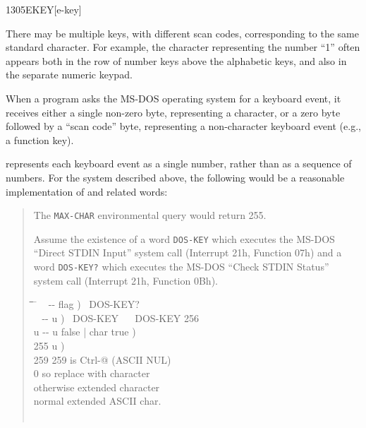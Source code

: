 \begin{worddef}{1305}{EKEY}[e-key]
\begin{defer}
		There may be multiple keys, with different scan codes,
		corresponding to the same standard character. For example,
		the character representing the number ``1'' often appears both
		in the row of number keys above the alphabetic keys, and also
		in the separate numeric keypad.

		When a program asks the MS-DOS operating system for a keyboard
		event, it receives either a single non-zero byte, representing
		a character, or a zero byte followed by a ``scan code'' byte,
		representing a non-character keyboard event (e.g., a function
		key).

		 represents each keyboard event as a single number,
		rather than as a sequence of numbers. For the system described
		above, the following would be a reasonable implementation of
		 and related words:

		\begin{quote}
			The \texttt{MAX-CHAR} environmental query would return 255.

			Assume the existence of a word
			\texttt{DOS-KEY} 
			which executes the MS-DOS ``Direct STDIN Input'' system call
			(Interrupt 21h, Function 07h) and a word
			\texttt{DOS-KEY?} 
			which executes the MS-DOS ``Check STDIN Status'' system call
			(Interrupt 21h, Function 0Bh).

			\ttfamily
			\begin{tabbing}
			\tab \= \tab \= \tab \= \tab \= \hspace{7em} \= \kill
			\word{:} ~  -{}- flag )~
				DOS-KEY?~  \word{;} \\[\parskip]

			\word{:} ~  -{}- u )~
				DOS-KEY~   ~
					DOS-KEY 256 \word{+}~  \word{;} \\[\parskip]

			\+ \word{:}   u -{}- u false | char true ) \\
				\+  255   		\>\>\>\>	\word{p} u ) \\
					 259 \word{=}  		\>\>\>		 259 is Ctrl-@ (ASCII NUL) \\
					\>  0  \>\>		 so replace with character \\
				\-   		\>\>\>		 otherwise extended character \\
			\-  						\>\>\>\>	 normal extended ASCII char. \\
			\word{;} \\[\parskip]


\end{tabbing}
\end{quote}
\end{defer}
\end{worddef}
